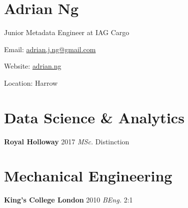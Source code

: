 \documentclass[../cv.tex]{subfiles}
\begin{document}
\section{Adrian Ng}
Junior Metadata Engineer at IAG Cargo
\hfill
\begin{description*}
	\item[Email:] \href{mailto:adrian.j.ng@gmail.com}{adrian.j.ng@gmail.com}
	\item[Website:] \href{https://adrian.ng}{adrian.ng}
	\item[Location:] Harrow
\end{description*}
\hfill
\vspace{0.25cm}
\noindent
\newline
\begin{minipage}[t]{0.6\linewidth}
	\begin{minipage}[t]{0.5\linewidth}
		\section{Data Science \& Analytics}
		\textbf{Royal Holloway} \hfill 2017
		\newline
		\textit{MSc.} \hfill Distinction
	\end{minipage}
	\hspace{0.2em}
	\begin{minipage}[t]{0.5\linewidth}
		\section{Mechanical Engineering}
		\textbf{King's College London} \hfill 2010
		\newline
		\textit{BEng.} \hfill 2:1
	\end{minipage}
\end{minipage}
\end{document}
